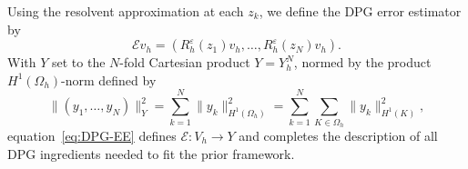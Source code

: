 \documentclass[12pt, oneside, reqno]{amsart}
\theoremstyle{remark}
\newcommand{\nquad}{N}
\newcommand{\EE}{\mathcal{E}}
\newcommand{\oh}{\Omega_h}
\begin{document}
Using the resolvent approximation at each $z_k$, we define
the DPG error estimator by
\begin{equation}
  \label{eq:DPG-EE}
  \EE v_h  = \left( R_h^\varepsilon (z_1)  v_h, \ldots,
    R_h^\varepsilon (z_\nquad)  v_h \right).  
\end{equation}
With $Y$ set to the $N$-fold Cartesian product $Y = Y_h^N$, normed by
the product $H^1(\oh)$-norm defined by 
\begin{equation}
\label{eq:element-by-element-Y-dpg}
  \| (y_1, \dots, y_N)  \|_Y^2 = \sum_{k=1}^N \| y_k\|_{H^1(\oh)}^2
  = \sum_{k=1}^N\sum_{K \in \oh}  \| y_k\|_{H^1(K)}^2, 
\end{equation}
equation~\eqref{eq:DPG-EE}  defines $\EE: V_h \to Y$ and completes
the description of all DPG ingredients needed to fit the prior
framework.
\end{document}
